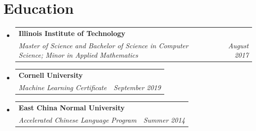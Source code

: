 \documentclass[letterpaper,10pt]{article}
\makeatletter
\newcommand{\resumeSubheading}[4]{
  \vspace{-1pt}\item
    \begin{tabular*}{0.97\textwidth}[t]{l@{\extracolsep{\fill}}r}
      \textbf{#1} & #2 \\
      \textit{\small#3} & \textit{\small #4} \\
    \end{tabular*}\vspace{-4pt}
}
\newcommand{\resumeSubHeadingListStart}{\begin{itemize}[leftmargin=0.15in, label={}]}
\newcommand{\resumeSubHeadingListEnd}{\end{itemize}}
\makeatother
\begin{document}
\section{Education}
  \resumeSubHeadingListStart
    \resumeSubheading
      {Illinois Institute of Technology}{}
      {Master of Science and Bachelor of Science in Computer Science; Minor in Applied Mathematics}{August 2017}
    \resumeSubheading
      {Cornell University}{}
      {Machine Learning Certificate}{September 2019}
    \resumeSubheading
      {East China Normal University}{}
      {Accelerated Chinese Language Program}{Summer 2014}
  \resumeSubHeadingListEnd

\end{document}
